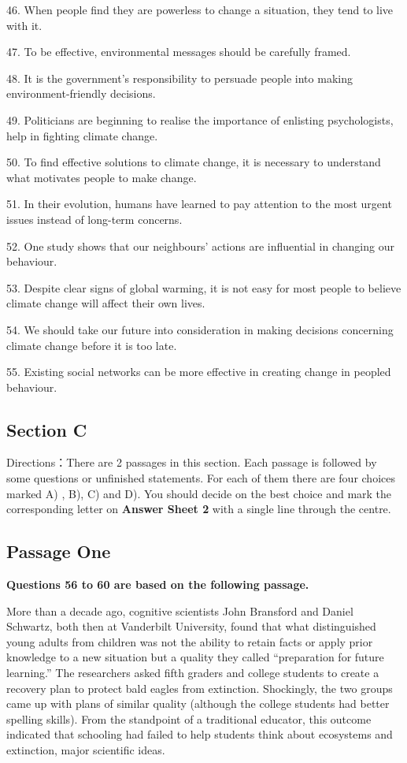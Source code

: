 \documentclass[UTF8,11pt]{ctexart}
\begin{document}
46. When people find they are powerless to change a situation, they tend to live with it.


47. To be effective, environmental messages should be carefully framed.


48. It is the government’s responsibility to persuade people into making environment-friendly decisions.


49. Politicians are beginning to realise the importance of enlisting psychologists, help in fighting climate change.


50. To find effective solutions to climate change, it is necessary to understand what motivates people to make change.


51. In their evolution, humans have learned to pay attention to the most urgent issues instead of long-term concerns.


52. One study shows that our neighbours’ actions are influential in changing our behaviour.


53. Despite clear signs of global warming, it is not easy for most people to believe climate change will affect their own lives.


54. We should take our future into consideration in making decisions concerning climate change before it is too late.


55. Existing social networks can be more effective in creating change in peopled behaviour.


\subsection*{\textbf{Section C}}


Directions：There are 2 passages in this section. Each passage is followed by some questions or unfinished statements. For each of them there are four choices marked A) , B), C) and D). You should decide on the best choice and mark the corresponding letter on\textbf{ Answer Sheet 2} with a single line through the centre.


\subsection*{\textbf{Passage One}}


\textbf{Questions 56 to 60 are based on the following passage.}


More than a decade ago, cognitive scientists John Bransford and Daniel Schwartz, both then at Vanderbilt University, found that what distinguished young adults from children was not the ability to retain facts or apply prior knowledge to a new situation but a quality they called “preparation for future learning.” The researchers asked fifth graders and college students to create a recovery plan to protect bald eagles from extinction. Shockingly, the two groups came up with plans of similar quality (although the college students had better spelling skills). From the standpoint of a traditional educator, this outcome indicated that schooling had failed to help students think about ecosystems and extinction, major scientific ideas.
\end{document}
